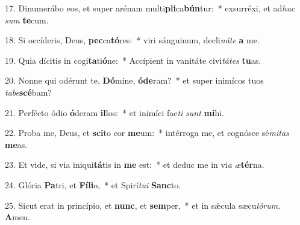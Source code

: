 17. Dinumerábo eos, et super arénam multi\textbf{pli}ca\textbf{bún}tur:~*  exsurréxi, et ad\textit{huc} \textit{sum} \textbf{te}cum.\

18. Si occíderis, Deus, \textbf{pec}ca\textbf{tó}res:~*  viri sánguinum, decli\textit{ná}\textit{te} \textbf{a} me.\

19. Quia dícitis in cogi\textbf{ta}ti\textbf{ó}ne:~*  Accípient in vanitáte civi\textit{tá}\textit{tes} \textbf{tu}as.\

20. Nonne qui odérunt te, \textbf{Dó}mine, \textbf{ó}\textbf{de}ram?~*  et super inimícos tuos \textit{ta}\textit{be}\textbf{scé}bam?\

21. Perfécto ódio \textbf{ó}deram \textbf{il}los:~*  et inimíci fac\textit{ti} \textit{sunt} \textbf{mi}hi.\

22. Proba me, Deus, et \textbf{sci}to cor \textbf{me}um:~*  intérroga me, et cognósce sé\textit{mi}\textit{tas} \textbf{me}as.\

23. Et vide, si via iniqui\textbf{tá}tis in \textbf{me} est:~*  et deduc me in vi\textit{a} \textit{æ}\textbf{tér}na.\

24. Glória \textbf{Pa}tri, et \textbf{Fí}\textbf{li}o,~*  et Spirí\textit{tu}\textit{i} \textbf{Sanc}to.\

25. Sicut erat in princípio, et \textbf{nunc}, et \textbf{sem}per,~*  et in sǽcula sæcu\textit{ló}\textit{rum}. \textbf{A}men.\

